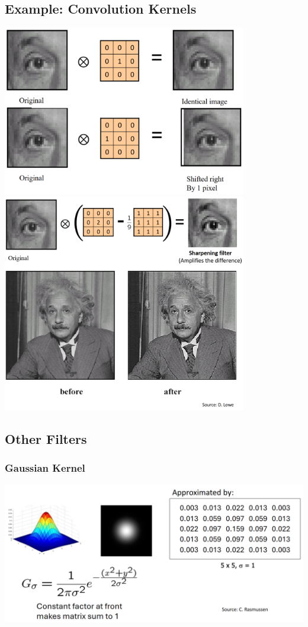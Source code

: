 \documentclass[10pt]{article}
\begin{document}
\subsection*{Example: Convolution Kernels}
\begin{center} 
	\includegraphics*[width=0.8\textwidth]{L2_11.png} \\
    \includegraphics*[width=0.8\textwidth]{L2_12.png} 
\end{center}

\subsection*{Other Filters}
\subsubsection*{Gaussian Kernel}
\begin{center} 
	\includegraphics*[width=\textwidth]{L2_13.png} 
\end{center}
\end{document}
